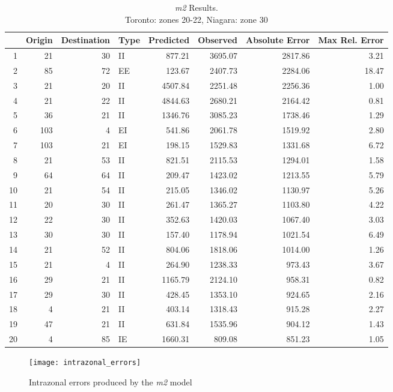 \begin{table}[ht]
\caption{\textit{m2} Results. \\Toronto: zones 20-22, Niagara: zone 30}
\label{table:m2-error-table}
\centering
\begin{tabular}{rrrlrrrr}
  \toprule
 & Origin & Destination & Type & Predicted & Observed & Absolute Error & Max Rel. Error \\ 
  \midrule
1 & 21 & 30 & II & 877.21 & 3695.07 & 2817.86 & 3.21 \\ 
  2 & 85 & 72 & EE & 123.67 & 2407.73 & 2284.06 & 18.47 \\ 
  3 & 21 & 20 & II & 4507.84 & 2251.48 & 2256.36 & 1.00 \\ 
  4 & 21 & 22 & II & 4844.63 & 2680.21 & 2164.42 & 0.81 \\ 
  5 & 36 & 21 & II & 1346.76 & 3085.23 & 1738.46 & 1.29 \\ 
  6 & 103 & 4 & EI & 541.86 & 2061.78 & 1519.92 & 2.80 \\ 
  7 & 103 & 21 & EI & 198.15 & 1529.83 & 1331.68 & 6.72 \\ 
  8 & 21 & 53 & II & 821.51 & 2115.53 & 1294.01 & 1.58 \\ 
  9 & 64 & 64 & II & 209.47 & 1423.02 & 1213.55 & 5.79 \\ 
  10 & 21 & 54 & II & 215.05 & 1346.02 & 1130.97 & 5.26 \\ 
  11 & 20 & 30 & II & 261.47 & 1365.27 & 1103.80 & 4.22 \\ 
  12 & 22 & 30 & II & 352.63 & 1420.03 & 1067.40 & 3.03 \\ 
  13 & 30 & 30 & II & 157.40 & 1178.94 & 1021.54 & 6.49 \\ 
  14 & 21 & 52 & II & 804.06 & 1818.06 & 1014.00 & 1.26 \\ 
  15 & 21 & 4 & II & 264.90 & 1238.33 & 973.43 & 3.67 \\ 
  16 & 29 & 21 & II & 1165.79 & 2124.10 & 958.31 & 0.82 \\ 
  17 & 29 & 30 & II & 428.45 & 1353.10 & 924.65 & 2.16 \\ 
  18 & 4 & 21 & II & 403.14 & 1318.43 & 915.28 & 2.27 \\ 
  19 & 47 & 21 & II & 631.84 & 1535.96 & 904.12 & 1.43 \\ 
  20 & 4 & 85 & IE & 1660.31 & 809.08 & 851.23 & 1.05 \\ 
   \bottomrule
\end{tabular}
\end{table}

\begin{figure}[H]
\centering
\texttt{[image: intrazonal\_errors]}
\caption{Intrazonal errors produced by the \textit{m2} model}
\label{fig:m2-intrazonal}
\end{figure}


